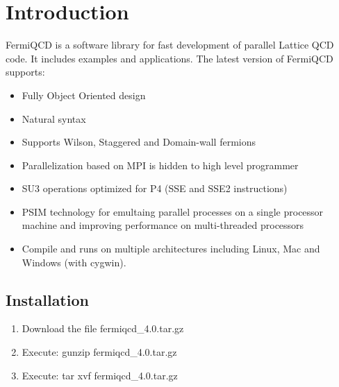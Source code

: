 





\section{Introduction}

FermiQCD is a software library for fast development of parallel Lattice QCD
code. It includes examples and applications. The latest version of FermiQCD
supports:

\begin{itemize}
\item  Fully Object Oriented design

\item  Natural syntax

\item  Supports Wilson, Staggered and Domain-wall fermions

\item  Parallelization based on MPI is hidden to high level programmer

\item  SU3 operations optimized for P4 (SSE and SSE2 instructions)

\item  PSIM technology for emultaing parallel processes on a single
processor machine and improving performance on multi-threaded processors

\item  Compile and runs on multiple architectures including Linux, Mac and
Windows (with cygwin).
\end{itemize}

\subsection{Installation}

\begin{enumerate}
\item  Download the file fermiqcd\_4.0.tar.gz

\item  Execute: gunzip fermiqcd\_4.0.tar.gz

\item  Execute: tar xvf fermiqcd\_4.0.tar.gz
\end{enumerate}

